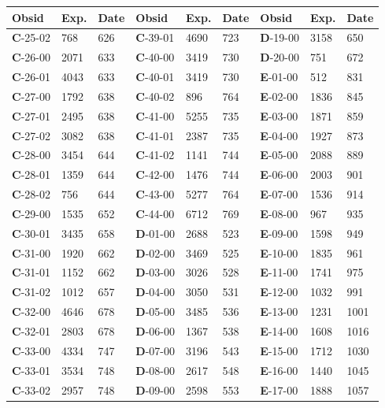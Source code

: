 \begin{table*}
\centering
\begin{tabular}{lllllllll}
\hline
\hline
\scriptsize Obsid&\scriptsize Exp.&\scriptsize Date&\scriptsize Obsid&\scriptsize Exp.&\scriptsize Date&\scriptsize Obsid&\scriptsize Exp.&\scriptsize Date\\
\hline
\textbf{C}-25-02&768&626&\textbf{C}-39-01&4690&723&\textbf{D}-19-00&3158&650\\
\textbf{C}-26-00&2071&633&\textbf{C}-40-00&3419&730&\textbf{D}-20-00&751&672\\
\textbf{C}-26-01&4043&633&\textbf{C}-40-01&3419&730&\textbf{E}-01-00&512&831\\
\textbf{C}-27-00&1792&638&\textbf{C}-40-02&896&764&\textbf{E}-02-00&1836&845\\
\textbf{C}-27-01&2495&638&\textbf{C}-41-00&5255&735&\textbf{E}-03-00&1871&859\\
\textbf{C}-27-02&3082&638&\textbf{C}-41-01&2387&735&\textbf{E}-04-00&1927&873\\
\textbf{C}-28-00&3454&644&\textbf{C}-41-02&1141&744&\textbf{E}-05-00&2088&889\\
\textbf{C}-28-01&1359&644&\textbf{C}-42-00&1476&744&\textbf{E}-06-00&2003&901\\
\textbf{C}-28-02&756&644&\textbf{C}-43-00&5277&764&\textbf{E}-07-00&1536&914\\
\textbf{C}-29-00&1535&652&\textbf{C}-44-00&6712&769&\textbf{E}-08-00&967&935\\
\textbf{C}-30-01&3435&658&\textbf{D}-01-00&2688&523&\textbf{E}-09-00&1598&949\\
\textbf{C}-31-00&1920&662&\textbf{D}-02-00&3469&525&\textbf{E}-10-00&1835&961\\
\textbf{C}-31-01&1152&662&\textbf{D}-03-00&3026&528&\textbf{E}-11-00&1741&975\\
\textbf{C}-31-02&1012&657&\textbf{D}-04-00&3050&531&\textbf{E}-12-00&1032&991\\
\textbf{C}-32-00&4646&678&\textbf{D}-05-00&3485&536&\textbf{E}-13-00&1231&1001\\
\textbf{C}-32-01&2803&678&\textbf{D}-06-00&1367&538&\textbf{E}-14-00&1608&1016\\
\textbf{C}-33-00&4334&747&\textbf{D}-07-00&3196&543&\textbf{E}-15-00&1712&1030\\
\textbf{C}-33-01&3534&748&\textbf{D}-08-00&2617&548&\textbf{E}-16-00&1440&1045\\
\textbf{C}-33-02&2957&748&\textbf{D}-09-00&2598&553&\textbf{E}-17-00&1888&1057\\

\end{tabular}
\end{table*}
